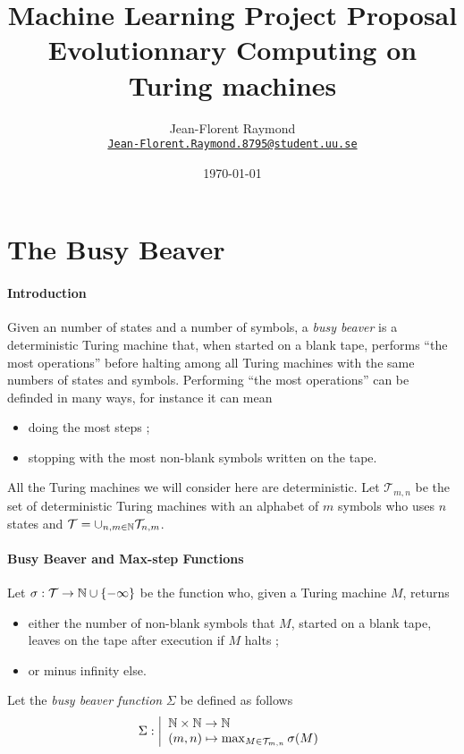 \documentclass{article}
\title{Machine Learning Project Proposal\\\textbf{Evolutionnary Computing on\\Turing machines}}
\author{Jean-Florent Raymond\\\href{mailto:Jean-Florent.Raymond.8795@student.uu.se}{\texttt{Jean-Florent.Raymond.8795@student.uu.se}}}
\date{\today}
\begin{document}
\maketitle

\section{The Busy Beaver}

\paragraph{Introduction} Given an number of states and a number of symbols, a \emph{busy beaver} is a deterministic Turing machine that, when started on a blank tape, performs ``the most operations'' before halting among all Turing machines with the same numbers of states and symbols. Performing ``the most operations'' can be definded in many ways, for instance it can mean
\begin{itemize}
\item doing the most steps ;
\item stopping with the most non-blank symbols written on the tape.
\end{itemize}

All the Turing machines we will consider here are deterministic. Let $\mathcal{T}_{m,n}$ be the set of deterministic Turing machines with an alphabet of $m$ symbols who uses $n$ states and $\mathcal{T} = \cup_{n,m \in \mathbb{N}} \mathcal{T}_{n,m}$.


\paragraph{Busy Beaver and Max-step Functions}
Let $\sigma : \mathcal{T} \to \mathbb{N} \cup \{-\infty\}$ be the function who, given a Turing machine $M$, returns
\begin{itemize}
\item either the number of non-blank symbols that $M$, started on a blank tape, leaves on the tape after execution if $M$ halts ;
\item or minus infinity else.
\end{itemize}

Let the \emph{busy beaver function} $\Sigma$ be defined as follows
\[
\Sigma : \left |
\begin{array}{l}
\mathbb{N} \times \mathbb{N} \to \mathbb{N}\\
(m,n) \mapsto \max_{M \in \mathcal{T}_{m,n}} \sigma(M)
\end{array}
\right .
\]
\end{document}
